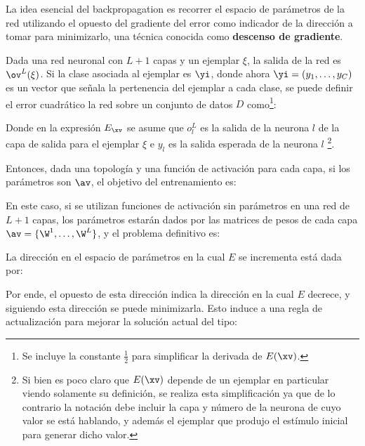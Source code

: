 La idea esencial del backpropagation es recorrer el espacio de parámetros de la red utilizando el opuesto del gradiente del error como indicador de la dirección a tomar para minimizarlo, una técnica conocida como \textbf{descenso de gradiente}.

Dada una red neuronal con $L+1$ capas  y un ejemplar $\xi$, la salida de la red es $\ov^L(\xi)$. Si la clase asociada al ejemplar es $\yi$, donde ahora $\yi=(y_1,\dots,y_C)$ es un vector que señala la pertenencia del ejemplar a cada clase, se puede definir el error cuadrático la red sobre un conjunto de datos $D$ como\footnote{Se incluye la constante $\frac{1}{2}$ para simplificar la derivada de $E(\xv)$.}:



Donde en la expresión $E_{\xv}$ se asume que $o^L_l$ es la salida de la neurona $l$ de la capa de salida para el ejemplar $\xi$ e $y_l$ es la salida esperada de la neurona $l$ \footnote{Si bien es poco claro que $E(\xv)$ depende de un ejemplar en particular viendo solamente su definición, se realiza esta simplificación ya que de lo contrario la notación debe incluir la capa y número de la neurona de cuyo valor se está hablando, y además el ejemplar que produjo el estímulo inicial para generar dicho valor.}. 

Entonces, dada una topología y una función de activación para cada capa, si los parámetros son $\av$, el objetivo del entrenamiento es:


En este caso, si se utilizan funciones de activación sin parámetros en una red de $L+1$ capas, los parámetros estarán dados por las matrices de pesos de cada capa $\av=\{\W^1,\dots,\W^L\}$, y el problema definitivo es:



La dirección en el espacio de parámetros en la cual $E$ se incrementa está dada por:


Por ende, el opuesto de esta dirección indica la dirección en la cual $E$ decrece, y siguiendo esta dirección se puede minimizarla. Esto induce a una regla de actualización para mejorar la solución actual del tipo:

